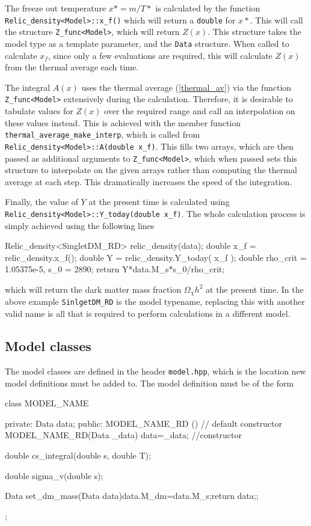 The freeze out temperature $x*=m/T*$ is calculated by the function \lstinline{Relic_density<Model>::x_f()} which will return a \lstinline{double} for $x*$.  This will call the structure \lstinline{Z_func<Model>}, which will return $Z(x)$.  This structure takes the model type as a template parameter, and the \lstinline{Data} structure.  When called to calculate $x_f$, since only a few evaluations are required, this will calculate $Z(x)$ from the thermal average each time.

The integral $A(x)$ uses the thermal average (\ref{thermal_av}) via the function \lstinline{Z_func<Model>} extensively during the calculation.  Therefore, it is desirable to tabulate values for $Z(x)$ over the required range and call an interpolation on these values instead.  This is achieved with the member function \lstinline{thermal_average_make_interp}, which is called from \lstinline{Relic_density<Model>::A(double x_f)}.  This fills two arrays, which are then passed as additional arguments to  \lstinline{Z_func<Model>}, which when passed sets this structure to interpolate on the given arrays rather than computing the thermal average at each step. This dramatically increases the speed of the integration.

Finally, the value of $Y$ at the present time is calculated using \lstinline{Relic_density<Model>::Y_today(double x_f)}.  The whole calculation process is simply achieved using the following lines
\begin{lstcpp}
Relic_density<SingletDM_RD> relic_density(data);
double x_f = relic_density.x_f();
double Y = relic_density.Y_today( x_f );
double rho_crit = 1.05375e-5, s_0 = 2890;
return  Y*data.M_s*s_0/rho_crit;
\end{lstcpp}
which will return the dark matter mass fraction $\Omega_{\chi} h^2$ at the present time.  In the above example \lstinline{SinlgetDM_RD} is the model typename, replacing this with another valid name is all that is required to perform calculations in a different model.



\subsection{Model classes}

The model classes are defined in the header \lstinline{model.hpp}, which is the location new model definitions must be added to.  The model definition must be of the form
\begin{lstcpp}
class MODEL_NAME
{
  private:
  Data data;
  public:
  MODEL_NAME_RD (){}  // default constructor
  MODEL_NAME_RD(Data _data)
  {
    data=_data;
   } //constructor
  
  double cs_integral(double s, double T);

  double sigma_v(double s);
 
  Data set_dm_mass(Data data){data.M_dm=data.M_s;return data;};
  
  
};
\end{lstcpp}

